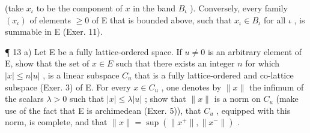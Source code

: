 (take \(x_{\iota}\) to be the component of \(x\) in the band \(B_{\iota}\) ). Conversely, every family \((x_{\iota})\) of elements \(\geqslant 0\) of E that is bounded above, such that \(x_{\iota} \in B_{\iota}\) for all \(\iota\) , is summable in E (Exer. 11).

¶ 13 a) Let E be a fully lattice-ordered space. If \(u \neq 0\) is an arbitrary element of E, show that the set of \(x \in E\) such that there exists an integer \(n\) for which \(|x| \leqslant n|u|\) , is a linear subspace \(C_u\) that is a fully lattice-ordered and co-lattice subspace (Exer. 3) of E. For every \(x \in C_u\) , one denotes by \(\|x\|\) the infimum of the scalars \(\lambda > 0\) such that \(|x| \leqslant \lambda |u|\) ; show that \(\|x\|\) is a norm on \(C_u\) (make use of the fact that E is archimedean (Exer. 5)), that \(C_u\) , equipped with this norm, is complete, and that \(\|x\| = \sup(\|x^+\|, \|x^-\|)\) .

